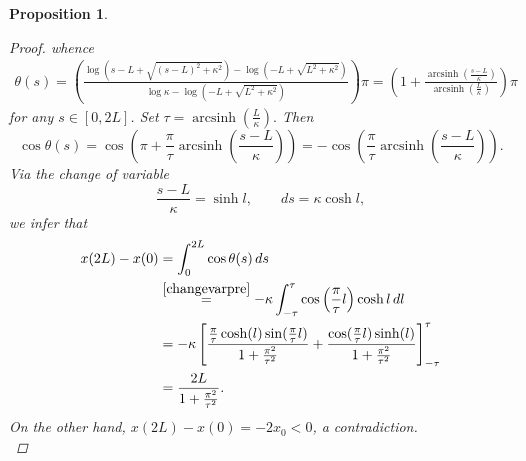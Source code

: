 \documentclass[11pt]{amsart}
\renewcommand{\k}{\kappa}
\DeclareMathOperator{\arcsinh}{arcsinh}
\newtheorem{proposition}[theorem]{Proposition}
\theoremstyle{definition}
\theoremstyle{remark}
\numberwithin{equation}{section}
\begin{document}
\begin{proposition}
\begin{proof}
		whence
		\begin{equation*}
			\begin{split}
				\theta(s)=\left(\frac{\log\left(s-L+\sqrt{(s-L)^2+\k^2}\right)-\log \left(-L+\sqrt{L^2+\k^2}\right)}{\log \k-\log\left(-L+\sqrt{L^2+\k^2}\right)}\right)\pi=\left(1+\frac{\arcsinh\left(\frac{s-L}{\k}\right)}{\arcsinh\left(\frac{L}{\k}\right)}\right)\pi
			\end{split}
		\end{equation*}
		for any $s\in[0,2L]$. Set $\tau=\arcsinh\left(\frac{L}{\k}\right).$ Then
		\begin{equation*}
			\cos\theta(s)=\cos\left(\pi+\frac{\pi}{\tau}\arcsinh\left(\frac{s-L}{\k}\right)\right)=-\cos\left(\frac{\pi}{\tau}\arcsinh\left(\frac{s-L}{\k}\right)\right).
		\end{equation*}
		Via the change of variable
		\begin{equation}\label{changevarpre}
			\frac{s-L}{\k}=\sinh l,\qquad ds=\k\cosh l,
		\end{equation}
		we infer that
		\begin{equation*}
			\begin{split}
				x(2L)-x(0)&=\int_0^{2L}\cos\theta(s)\,ds\\
				&\overset{\eqref{changevarpre}}{=}-\k\int_{-\tau}^{\tau}\cos\left(\frac{\pi}{\tau} l\right)\cosh l\,dl\\
				&=-\k \left[\frac{
					\frac{\pi}{\tau} \cosh(l) \sin(\frac{\pi}{\tau} l)
				}{
					1 + \frac{\pi^2}{\tau^2}
				}+\frac{\cos(\frac{\pi}{\tau} l) \sinh(l) }{1 + \frac{\pi^2}{\tau^2}}\right]_{-\tau}^{\tau}\\
				&=\frac{2L}{1 + \frac{\pi^2}{\tau^2}}.
		\end{split}
	\end{equation*}
	On the other hand, $x(2L)-x(0)=-2x_0<0$, a contradiction.\\

\end{proof}
\end{proposition}
\end{document}
